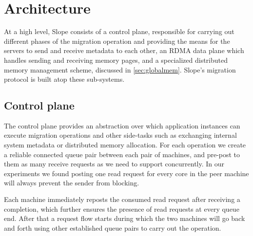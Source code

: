 \section{Architecture}
At a high level, Slope consists of a control plane, responsible for carrying out
different phases of the migration operation and providing the means for the
servers to send and receive metadata to each other, an RDMA data plane
which handles sending and receiving memory pages,
and a specialized distributed memory management scheme, discussed in 
\autoref{sec:globalmem}. Slope's migration protocol is built atop these sub-systems.


\subsection{Control plane}
The control plane provides an abstraction over which application instances can
execute migration operations and other side-tasks such as exchanging internal
system metadata or distributed memory allocation. For each operation we create
a reliable connected queue pair between each pair of machines, and pre-post to
them as many receive requests as we need to support concurrently. In our
experiments we found posting one read request for every core in the peer machine
will always prevent the sender from blocking.

Each machine immediately reposts
the consumed read request after receiving a completion, which further ensures
the presence of read requests at every queue end. After that a request
flow starts during which the two machines will go back and forth using other
established queue pairs to carry out the operation.




